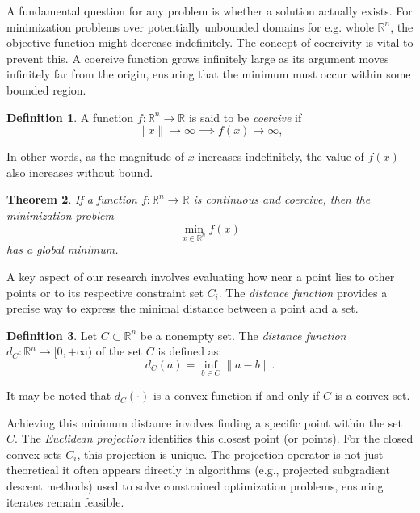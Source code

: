 \documentclass[12pt]{article}
\theoremstyle{plain}
\newtheorem{theorem}{Theorem}[section]
\theoremstyle{definition}
\newtheorem{definition}[theorem]{Definition}
\begin{document}
A fundamental question for any problem is whether a solution actually exists. For minimization problems over potentially unbounded domains for e.g.  whole \( \mathbb{R}^n \), the objective function might decrease indefinitely. The concept of coercivity is vital to prevent this. A coercive function grows infinitely large as its argument moves infinitely far from the origin, ensuring that the minimum must occur within some bounded region.


\begin{definition}\cite[Definition 2.31]{Be14}
	A function \( f: \mathbb{R}^n \to \mathbb{R} \) is said to be \textit{coercive} if 
	\[
	\| x \| \to \infty \implies f(x) \to \infty,
	\]
	
	In other words, as the magnitude of \( x \) increases indefinitely, the value of \( f(x) \) also increases without bound.
\end{definition}

\begin{theorem}\label{coercivity_theorem}
	\cite[Corollary 1.7]{BrTi11}
	If a function \( f: \mathbb{R}^n \to \mathbb{R} \) is continuous and coercive, then the minimization problem 
	\[
	\min_{x \in \mathbb{R}^n} f(x)
	\]
	has a global minimum.
	
\end{theorem}	

A key aspect of our research involves evaluating how near a point lies to other points or to its respective constraint set \( C_i \). The \emph{distance function} provides a precise way to express the minimal distance between a point and a set.

\begin{definition} Let \( C \subset \mathbb{R}^n \) be a nonempty set. The \textit{distance function} \( d_C : \mathbb{R}^n \to [0, +\infty) \) of the set \( C \) is defined as:
	\[
	d_C(a) = \inf_{b \in C} \| a - b \|.
	\] 
	
	It may be noted that $	d_C(\cdot)$	is a convex function if and only if $C$ is a convex set.
	
\end{definition}	

Achieving this minimum distance involves finding a specific point within the set $C$. The \emph{Euclidean projection} identifies this closest point (or points). For the closed convex sets $C_i$, this projection is unique. The projection operator is not just theoretical it often appears directly in algorithms (e.g., projected subgradient descent methods) used to solve constrained optimization problems, ensuring iterates remain feasible.
\end{document}
